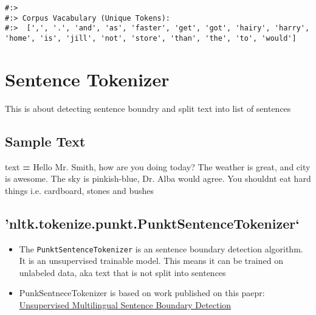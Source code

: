 \documentclass[
]{book}
\newenvironment{Shaded}{\begin{snugshade}}{\end{snugshade}}
\newcommand{\NormalTok}[1]{#1}
\newcommand{\OperatorTok}[1]{\textcolor[rgb]{0.43,0.43,0.43}{\textbf{#1}}}
\newcommand{\StringTok}[1]{\textcolor[rgb]{0.5,0.5,0.5}{#1}}
\providecommand{\tightlist}{%
  \setlength{\itemsep}{0pt}\setlength{\parskip}{0pt}}
\begin{document}
\begin{verbatim}
#:> 
#:> Corpus Vacabulary (Unique Tokens):
#:>  [',', '.', 'and', 'as', 'faster', 'get', 'got', 'hairy', 'harry', 'home', 'is', 'jill', 'not', 'store', 'than', 'the', 'to', 'would']
\end{verbatim}

\hypertarget{sentence-tokenizer}{%
\section{Sentence Tokenizer}\label{sentence-tokenizer}}

This is about detecting sentence boundry and split text into list of sentences

\hypertarget{sample-text}{%
\subsection{Sample Text}\label{sample-text}}

\begin{Shaded}
\begin{Highlighting}[]
\NormalTok{text }\OperatorTok{=} \StringTok{\textquotesingle{}\textquotesingle{}\textquotesingle{}}
\StringTok{Hello Mr. Smith, how are you doing today?}
\StringTok{The weather is great, and city is awesome.}
\StringTok{The sky is pinkish{-}blue, Dr. Alba would agree.}
\StringTok{You shouldn\textquotesingle{}t eat hard things i.e. cardboard, stones and bushes}
\StringTok{\textquotesingle{}\textquotesingle{}\textquotesingle{}}
\end{Highlighting}
\end{Shaded}

\hypertarget{nltk.tokenize.punkt.punktsentencetokenizer}{%
\subsection{'nltk.tokenize.punkt.PunktSentenceTokenizer`}\label{nltk.tokenize.punkt.punktsentencetokenizer}}

\begin{itemize}
\tightlist
\item
  The \texttt{PunktSentenceTokenizer} is an sentence boundary detection algorithm. It is an unsupervised trainable model. This means it can be trained on unlabeled data, aka text that is not split into sentences\\
\item
  PunkSentneceTokenizer is based on work published on this paepr: \href{https://www.mitpressjournals.org/doi/abs/10.1162/coli.2006.32.4.485\#.V2ouLXUrLeQ}{Unsupervised Multilingual Sentence Boundary Detection}
\end{itemize}
\end{document}
